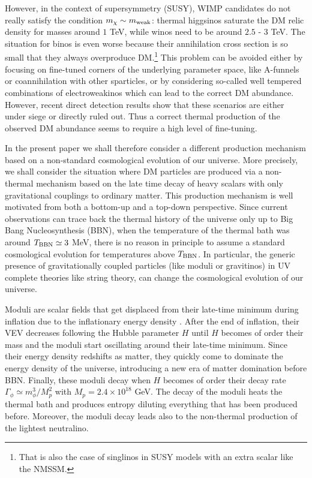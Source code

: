 \documentclass[11pt,a4paper]{article}
\begin{document}
However, in the context of supersymmetry (SUSY), WIMP candidates do not really satisfy the condition $m_\chi\sim m_{\rm weak}$: thermal higgsinos saturate the DM relic density for masses around $1$ TeV, while winos need to be around $2.5$ - $3$ TeV. The situation for binos is even worse because their annihilation cross section is so small that they always overproduce DM.\footnote{That is also the case of singlinos in SUSY models with an extra scalar like the NMSSM.} This problem can be avoided either by focusing on fine-tuned corners of the underlying parameter space, like A-funnels or coannihilation with other sparticles, or by considering so-called well tempered combinations of electroweakinos which can lead to the correct DM abundance. However, recent direct detection results show that these scenarios are either under siege or directly ruled out. Thus a correct thermal production of the observed DM abundance seems to require a high level of fine-tuning. 

In the present paper we shall therefore consider a different production mechanism based on a non-standard cosmological evolution of our universe. More precisely, we shall consider the situation where DM particles are produced via a non-thermal mechanism based on the late time decay of heavy scalars with only gravitational couplings to ordinary matter. This production mechanism is well motivated from both a bottom-up and a top-down perspective. Since current observations can trace back the thermal history of the universe only up to Big Bang Nucleosynthesis (BBN), when the temperature of the thermal bath was around $T_{\rm BBN} \simeq 3$ MeV, there is no reason in principle to assume a standard cosmological evolution for temperatures above $T_{\rm BBN}$. In particular, the generic presence of gravitationally coupled particles (like moduli or gravitinos) in UV complete theories like string theory, can change the cosmological evolution of our universe.

Moduli are scalar fields that get displaced from their late-time minimum during inflation due to the inflationary energy density \cite{Dine:1995kz}. After the end of inflation, their VEV decreases following the Hubble parameter $H$ until $H$ becomes of order their mass and the moduli start oscillating around their late-time minimum. Since their energy density redshifts as matter, they quickly come to dominate the energy density of the universe, introducing a new era of matter domination before BBN. Finally, these moduli decay when $H$ becomes of order their decay rate $\Gamma_\phi \simeq m_\phi^3/M_p^2$ with $M_p=2.4 \times 10^{18}$ GeV. The decay of the moduli heats the thermal bath and produces entropy diluting everything that has been produced before. Moreover, the moduli decay leads also to the non-thermal production of the lightest neutralino. 
\end{document}
